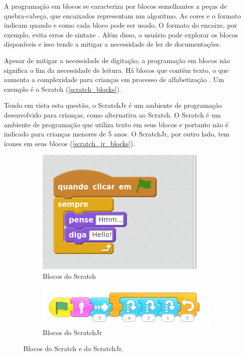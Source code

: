A programação em blocos se caracteriza por blocos semelhantes a peças de quebra-cabeça, que encaixados representam um algoritmo. As cores e o formato indicam quando e como cada bloco pode ser usado. O formato do encaixe, por exemplo, evita erros de sintaxe \cite{weintrop_block-based_2019}. Além disso, o usuário pode explorar os blocos disponíveis e isso tende a mitigar a necessidade de ler de documentações. 

Apesar de mitigar a necessidade de digitação, a programação em blocos não significa o fim da necessidade de leitura. Há blocos que contém texto, o que aumenta a complexidade para crianças em processo de alfabetização \cite{flannery_designing_2013}. Um exemplo é o Scratch (\autoref{scratch_blocks}).

Tendo em vista esta questão, o ScratchJr é um ambiente de programação desenvolvido para crianças, como alternativa ao Scratch. O Scratch é um ambiente de programação que utiliza texto em seus blocos e portanto não é indicado para crianças menores de 5 anos. O ScratchJr, por outro lado, tem ícones em seus blocos (\autoref{scratch_jr_blocks}).

\begin{figure}[!htbp]
    \centering
    \begin{subfigure}{.35\textwidth}
        \centering
        \includegraphics[width=.9\linewidth,fbox]{figs/scratch_blocos.png}
        \caption{Blocos do Scratch}
        \label{scratch_blocks}
    \end{subfigure}%
    \begin{subfigure}{.65\textwidth}
        \centering
        \includegraphics[width=.9\linewidth,fbox]{figs/scratch_jr.png}
        \caption{Blocos do ScratchJr}
        \label{scratch_jr_blocks}
    \end{subfigure}
    \caption{Blocos do Scratch e do ScratchJr.}
    \sourceauthor
    \label{scratch_scratch_jr_blocks}
\end{figure}

